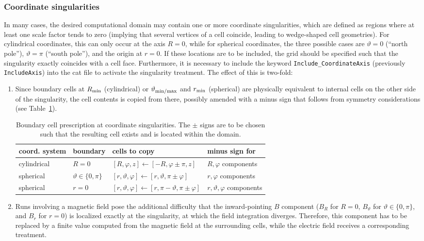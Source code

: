 \subsubsection{Coordinate singularities}

In many cases, the desired computational domain may contain one or more
coordinate singularities, which are defined as regions where at least one
scale factor tends to zero (implying that several vertices of a cell coincide,
leading to wedge-shaped cell geometries). For cylindrical coordinates, this
can only occur at the axis $R=0$, while for spherical coordinates, the three
possible cases are $\vartheta=0$ (``north pole''), $\vartheta=\pi$
(``south pole''), and the origin at $r=0$. If these locations are to be
included, the grid should be specified such that the singularity exactly
coincides with a cell face. Furthermore, it is necessary to include the
keyword {\tt Include\_CoordinateAxis} (previously {\tt IncludeAxis}) into the
cat file to activate the singularity treatment. The effect of this is two-fold:
\begin{enumerate}
\item Since boundary cells at $R_{\rm min}$ (cylindrical) or
$\vartheta_{\rm min/max}$ and $r_{\rm min}$ (spherical) are physically
equivalent to internal cells on the other side of the singularity, the cell
contents is copied from there, possibly amended with a minus sign that follows
from symmetry considerations (see Table~\ref{tab:singular}).
\begin{table}
  \begin{tabular}{llll}
    coord. system & boundary & cells to copy & minus sign for \\ \hline
    cylindrical   & $R=0$ & $[R,\varphi,z]
    \leftarrow [-R,\varphi \pm \pi,z]$ & $R,\varphi$ components \\
    spherical & $\vartheta \in \{0,\pi\}$ & $[r,\vartheta,\varphi]
    \leftarrow [r,\vartheta,\pi \pm \varphi]$ & $r,\varphi$ components \\
    spherical & $r=0$ & $[r,\vartheta,\varphi]
    \leftarrow [r,\pi-\vartheta,\pi \pm \varphi]$ &
    $r,\vartheta, \varphi$ components \\
    \hline
  \end{tabular}
  \caption{\label{tab:singular}
    Boundary cell prescription at coordinate singularities.
    The $\pm$ signs are to be chosen such that the resulting cell exists and
    is located within the domain.
  }
\end{table}
\item Runs involving a magnetic field pose the additional difficulty that the
inward-pointing $B$ component
($B_R$ for $R=0$, $B_{\vartheta}$ for $\vartheta \in \{0,\pi\}$, and $B_r$
for $r=0$) is localized exactly at the singularity, at which the field
integration diverges.
Therefore, this component has to be replaced by a finite value computed
from the magnetic field at the surrounding cells, while the electric field
receives a corresponding treatment.
\end{enumerate}
